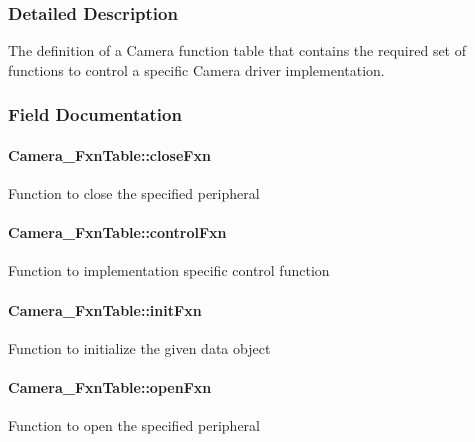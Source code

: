 \subsubsection{Detailed Description}
The definition of a Camera function table that contains the required set of functions to control a specific Camera driver implementation. 

\subsubsection{Field Documentation}
\paragraph[{close\+Fxn}]{ Camera\+\_\+\+Fxn\+Table\+::close\+Fxn}\label{struct_camera___fxn_table_af279c6a9d953882c3d7ce26da6899ad7}
Function to close the specified peripheral 
\paragraph[{control\+Fxn}]{ Camera\+\_\+\+Fxn\+Table\+::control\+Fxn}\label{struct_camera___fxn_table_a4f2a817f5f93b5c30f25830a75b524aa}
Function to implementation specific control function 
\paragraph[{init\+Fxn}]{ Camera\+\_\+\+Fxn\+Table\+::init\+Fxn}\label{struct_camera___fxn_table_a785c5f005aa70b0205f5a24f5286ac02}
Function to initialize the given data object 
\paragraph[{open\+Fxn}]{ Camera\+\_\+\+Fxn\+Table\+::open\+Fxn}\label{struct_camera___fxn_table_a1a1ffb4979ca2e85f513b06bc32794cb}
Function to open the specified peripheral 
